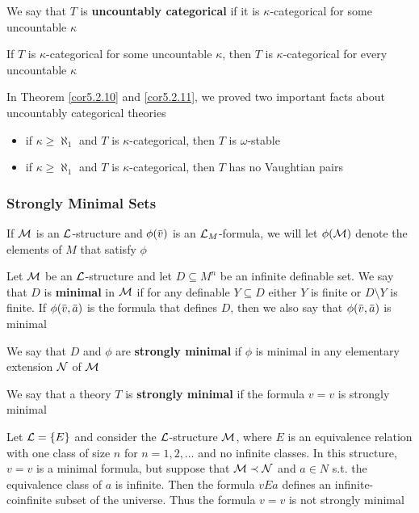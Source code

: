 \documentclass[11pt]{article}
\begin{document}
We say that \(T\) is \textbf{uncountably categorical} if it is \(\kappa\)-categorical for some uncountable \(\kappa\)

\begin{theorem}
If \(T\) is \(\kappa\)-categorical for some uncountable \(\kappa\), then \(T\) is \(\kappa\)-categorical for every
uncountable \(\kappa\)
\end{theorem}

In Theorem \ref{cor5.2.10} and \ref{cor5.2.11}, we proved two important facts about uncountably
categorical theories
\begin{itemize}
\item if \(\kappa\ge\aleph_1\) and \(T\) is \(\kappa\)-categorical, then \(T\) is \(\omega\)-stable
\item if \(\kappa\ge\aleph_1\) and \(T\) is \(\kappa\)-categorical, then \(T\) has no Vaughtian pairs
\end{itemize}
\subsubsection{Strongly Minimal Sets}
\label{sec:org23ea5e0}
If \(\mathcal{M}\) is an \(\mathcal{L}\)-structure and \(\phi(\barv)\) is an \(\mathcal{L}_M\)-formula, we will let \(\phi(\mathcal{M})\)
denote the elements of \(M\) that satisfy \(\phi\)
\begin{definition}[]
Let \(\mathcal{M}\) be an \(\mathcal{L}\)-structure and let \(D\subseteq M^n\) be an infinite definable set. We say
that \(D\) is \textbf{minimal} in \(\mathcal{M}\) if for any definable \(Y\subseteq D\) either \(Y\) is finite
or \(D\setminus Y\) is finite. If \(\phi(\barv,\bara)\) is the formula that defines \(D\), then we also say
that \(\phi(\barv,\bara)\) is minimal

We say that \(D\) and \(\phi\) are \textbf{strongly minimal} if \(\phi\) is minimal in any elementary extension \(\mathcal{N}\)
of \(\mathcal{M}\)

We say that a theory \(T\) is \textbf{strongly minimal} if the formula \(v=v\) is strongly minimal
\end{definition}

Let \(\mathcal{L}=\{E\}\) and consider the \(\mathcal{L}\)-structure \(\mathcal{M}\), where \(E\) is an equivalence relation
with one class of size \(n\) for \(n=1,2,\dots\) and no infinite classes. In this structure, \(v=v\)
is a minimal formula, but suppose that \(\mathcal{M}\prec\mathcal{N}\) and \(a\in N\) s.t. the equivalence class of \(a\)
is infinite. Then the formula \(vEa\) defines an infinite-coinfinite subset of the universe.
Thus the formula \(v=v\) is not strongly minimal
\end{document}
